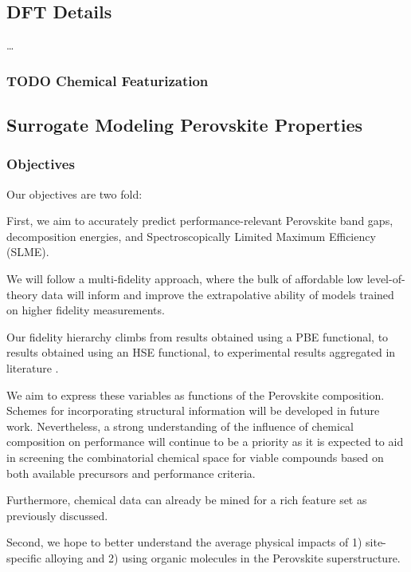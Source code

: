 \documentclass[aip, jmp, amsmath, amssymb]{revtex4-2}
\begin{document}
\subsection*{DFT Details}
\label{sec:orgfa9b9d0}
\ldots{}\\

\subsubsection*{{\bfseries\sffamily TODO} Chemical Featurization}
\label{sec:orgccd0710}

\subsection*{Surrogate Modeling Perovskite Properties}
\label{sec:org03d60c9}
\subsubsection*{Objectives}
\label{sec:org6df1a3c}
Our objectives are two fold:

First, we aim to accurately predict performance-relevant Perovskite
band gaps, decomposition energies, and Spectroscopically Limited Maximum
Efficiency (SLME).

We will follow a multi-fidelity approach, where the bulk of affordable
low level-of-theory data will inform and improve the extrapolative
ability of models trained on higher fidelity measurements.

Our fidelity hierarchy climbs from results obtained using a PBE
functional, to results obtained using an HSE functional, to
experimental results aggregated in literature \cite{almora-2020-devic-perfor}.

We aim to express these variables as functions of the Perovskite
composition. Schemes for incorporating structural information will be
developed in future work. Nevertheless, a strong understanding of the
influence of chemical composition on performance will continue to be a
priority as it is expected to aid in screening the combinatorial
chemical space for viable compounds based on both available precursors
and performance criteria.

Furthermore, chemical data can already be mined for a rich feature set
as previously discussed.

Second, we hope to better understand the average physical impacts
of 1) site-specific alloying and 2) using organic molecules in the
Perovskite superstructure.
\end{document}
